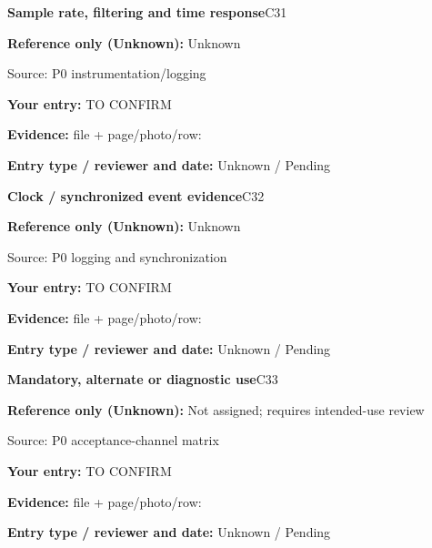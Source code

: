 \documentclass[11pt]{article}
\begin{document}
\begin{minipage}{\textwidth}\small
{\color{navy}\bfseries Sample rate, filtering and time response}\hfill C31\par
\colorbox{pale}{\parbox{\dimexpr\linewidth-2\fboxsep\relax}{
\textbf{Reference only (Unknown):} Unknown\par
{\footnotesize Source: P0 instrumentation/logging}}}\par
\textbf{Your entry:} {\color{muted}TO CONFIRM}\enspace\hrulefill\par
{\footnotesize\textbf{Evidence:} file + page/photo/row: \hrulefill\par
\textbf{Entry type / reviewer and date:} Unknown / Pending\par
}\end{minipage}\par\vspace{5pt}
\begin{minipage}{\textwidth}\small
{\color{navy}\bfseries Clock / synchronized event evidence}\hfill C32\par
\colorbox{pale}{\parbox{\dimexpr\linewidth-2\fboxsep\relax}{
\textbf{Reference only (Unknown):} Unknown\par
{\footnotesize Source: P0 logging and synchronization}}}\par
\textbf{Your entry:} {\color{muted}TO CONFIRM}\enspace\hrulefill\par
{\footnotesize\textbf{Evidence:} file + page/photo/row: \hrulefill\par
\textbf{Entry type / reviewer and date:} Unknown / Pending\par
}\end{minipage}\par\vspace{5pt}
\begin{minipage}{\textwidth}\small
{\color{navy}\bfseries Mandatory, alternate or diagnostic use}\hfill C33\par
\colorbox{pale}{\parbox{\dimexpr\linewidth-2\fboxsep\relax}{
\textbf{Reference only (Unknown):} Not assigned; requires intended-use review\par
{\footnotesize Source: P0 acceptance-channel matrix}}}\par
\textbf{Your entry:} {\color{muted}TO CONFIRM}\enspace\hrulefill\par
{\footnotesize\textbf{Evidence:} file + page/photo/row: \hrulefill\par
\textbf{Entry type / reviewer and date:} Unknown / Pending\par
}\end{minipage}\par\vspace{5pt}
\end{document}
